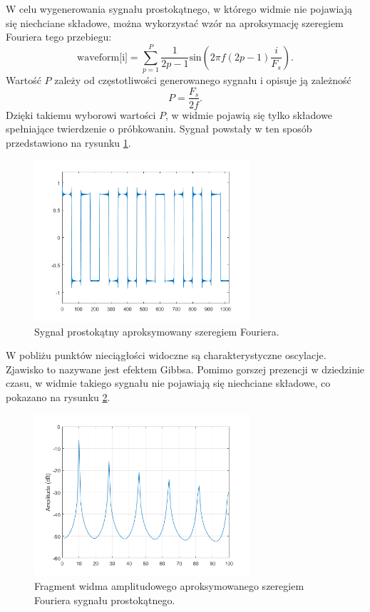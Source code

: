 W celu wygenerowania sygnału prostokątnego, w którego widmie nie pojawiają się niechciane składowe, można wykorzystać wzór na aproksymację szeregiem Fouriera tego przebiegu:
\begin{equation} \label{equ:sub_gibbs}
\text{waveform[i]} = \sum_{p=1}^{P}\frac{1}{2p-1}\text{sin}(2\pi f(2p-1)  \frac{i}{F_s}).
\end{equation}
Wartość $P$ zależy od częstotliwości generowanego sygnału i opisuje ją zależność 
\begin{equation} \label{equ:sub_gibbs2}
P = \frac{F_s}{2f}.
\end{equation}
Dzięki takiemu wyborowi wartości $P$, w widmie pojawią się tylko składowe spełniające twierdzenie o próbkowaniu. Sygnał powstały w ten sposób przedstawiono na rysunku \ref{rys:sub_gibbs2}.
 \begin{figure}[H]
 	\centering
 	\includegraphics[width=8cm]{grafiki/sub_gibbs2}
 	\captionsetup{justification=centering}
 	\caption{Sygnał prostokątny aproksymowany szeregiem Fouriera.}
 	\label{rys:sub_gibbs2}
 \end{figure}

W pobliżu punktów nieciągłości widoczne są charakterystyczne oscylacje. Zjawisko to nazywane jest efektem Gibbsa. Pomimo gorszej prezencji w dziedzinie czasu, w widmie takiego sygnału nie pojawiają się niechciane składowe, co pokazano na rysunku \ref{rys:sub_gibbs3}.
\begin{figure}[H]
	\centering
	\includegraphics[width=8cm]{grafiki/sub_gibbs3}
	\captionsetup{justification=centering}
	\caption{Fragment widma amplitudowego aproksymowanego szeregiem Fouriera sygnału prostokątnego.}
	\label{rys:sub_gibbs3}
\end{figure}

